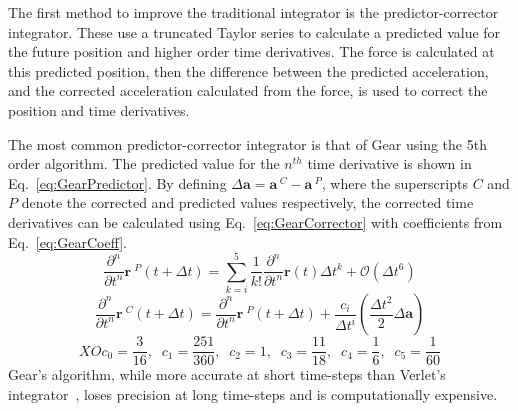 \documentclass[12pt]{UoAthesis} \usepackage{booktabs}
\begin{document}
The first method to improve the traditional integrator is the
predictor-corrector integrator. These use a truncated Taylor series to
calculate a predicted value for the future position and higher order
time derivatives. The force is calculated at this predicted position,
then the difference between the predicted acceleration, and the
corrected acceleration calculated from the force, is used to correct
the position and time derivatives.

The most common predictor-corrector integrator is that of Gear
\cite{Gear1971} using the 5th order algorithm. The predicted value for
the $n^{th}$ time derivative is shown in
Eq.~\eqref{eq:GearPredictor}. By defining $\Delta \mathbf{a} =
\mathbf{a}\,^{C} - \mathbf{a}\,^{P}$, where the superscripts $C$ and
$P$ denote the corrected and predicted values respectively, the
corrected time derivatives can be calculated using
Eq.~\eqref{eq:GearCorrector} with coefficients from
Eq.~\eqref{eq:GearCoeff}.
\begin{equation}
  \frac{\partial^{n}}{\partial t^{n}} \mathbf{r}\:^{P}(t+\Delta t)
  =\sum^{5}_{k=i} \frac{1}{k!}\frac{\partial^{n} }{\partial t^{n}}
  \mathbf{r}(t) \Delta t^{k} + \mathcal{O}(\Delta t^6)
  \label{eq:GearPredictor} 
\end{equation}
\begin{equation}
  \frac{\partial^{n}}{\partial t^{n}} \mathbf{r}\:^{C}(t+\Delta t)
  =\frac{\partial^{n} }{\partial t^{n}} \mathbf{r}\:^{P}(t+\Delta t)
  +\frac{c_i}{\Delta t^i} \left(\frac{\Delta t^2}{2}\Delta \mathbf{a}\right)
  \label{eq:GearCorrector} \end{equation} 
\begin{equation} 
  XOc_0 =
  \frac{3}{16},\;\;c_1 = \frac{251}{360},\;\; c_2 = 1,\;\; c_3 =
  \frac{11}{18},\;\; c_4 =
  \frac{1}{6},\;\; c_5 = \frac{1}{60} \label{eq:GearCoeff} 
\end{equation}
Gear's algorithm, while more accurate at short time-steps than Verlet's
integrator~\cite{Haile1997}, loses precision at long time-steps and is
computationally expensive.  
\end{document}
